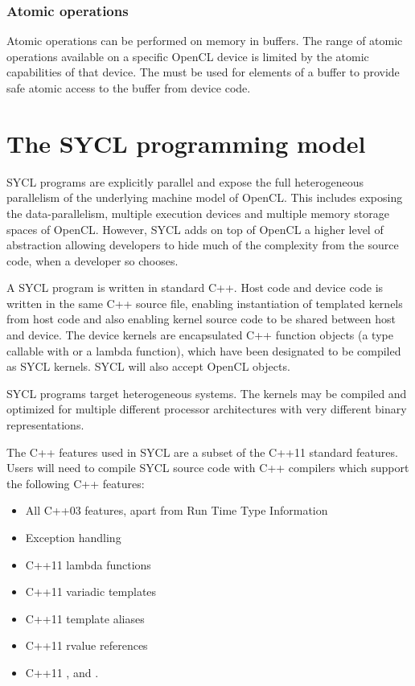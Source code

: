 \subsubsection{Atomic operations}

Atomic operations can be performed on memory in buffers. The range of
atomic operations available on a specific OpenCL device is limited by
the atomic capabilities of that device.  The
 must be used for elements of a buffer
to provide safe atomic access to the buffer from device code.

\section{The SYCL programming model}

SYCL programs are explicitly parallel and expose the full heterogeneous
parallelism of the underlying machine model of OpenCL. This includes exposing
the data-parallelism, multiple execution devices and multiple memory storage
spaces of OpenCL. However, SYCL adds on top of OpenCL a higher level of
abstraction allowing developers to hide much of the complexity from the source
code, when a developer so chooses.

A SYCL program is written in standard C++. Host code and device code is
written in the same C++ source file, enabling instantiation of templated
kernels from host code and also enabling kernel source code to be shared
between host and device.
The device kernels are encapsulated C++ function objects (a
type callable with  or a lambda function), which have
been designated to be compiled as SYCL kernels. SYCL will
also accept OpenCL  objects.

SYCL programs target heterogeneous systems. The kernels may be compiled and
optimized for multiple different processor architectures with very different
binary representations.

The C++ features used in SYCL are a subset of the C++11 standard features.
Users will need to compile SYCL source code with C++ compilers which support
the following C++ features:
\begin{itemize}
\item All C++03 features, apart from Run Time Type Information
\item Exception handling
\item C++11 lambda functions
\item C++11 variadic templates
\item C++11 template aliases
\item C++11 rvalue references
\item C++11 ,  and
  .
\end{itemize}

